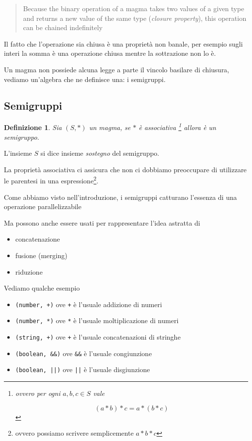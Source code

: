 \documentclass[12pt]{article}
\newtheorem{definition}{Definizione}
\begin{document}
\begin{quote}
Because the binary operation of a magma takes two values of a given type and returns a new value of the same type (\emph{closure property}),
this operation can be chained indefinitely
\end{quote}

Il fatto che l'operazione sia chiusa è una proprietà non banale,
per esempio sugli interi la somma è una operazione chiusa mentre la sottrazione non lo è.

Un magma non possiede alcuna legge a parte il vincolo basilare di chiusura, vediamo un'algebra che ne definisce una: i semigruppi.

\subsection{Semigruppi}

\begin{definition}
Sia $(S, *)$ un magma, se $*$ è associativa \footnote{ovvero per ogni $a, b, c \in S$ vale

$$
(a * b) * c = a * ( b * c )
$$
} allora è un \emph{semigruppo}.
\end{definition}

L'insieme $S$ si dice insieme \emph{sostegno} del semigruppo.

La proprietà associativa ci assicura che non ci dobbiamo preoccupare di utilizzare le parentesi in una espressione\footnote{ovvero possiamo scrivere semplicemente $a * b * c$}.

Come abbiamo visto nell'introduzione, i semigruppi catturano l'essenza di una operazione parallelizzabile

Ma possono anche essere usati per rappresentare l'idea astratta di

\begin{itemize}
  \item concatenazione
  \item fusione (merging)
  \item riduzione
\end{itemize}

Vediamo qualche esempio

\begin{itemize}
  \item \texttt{(number, +)} ove \texttt{+} è l'usuale addizione di numeri
  \item \texttt{(number, *)} ove \texttt{*} è l'usuale moltiplicazione di numeri
  \item \texttt{(string, +)} ove \texttt{+} è l'usuale concatenazioni di stringhe
  \item \texttt{(boolean, \&\&)} ove \texttt{\&\&} è l'usuale congiunzione
  \item \texttt{(boolean, ||)} ove \texttt{||} è l'usuale disgiunzione
\end{itemize}
\end{document}
